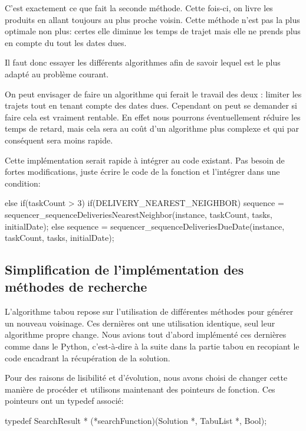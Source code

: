 \documentclass[hideweeklyreports]{polytech/polytech}
\begin{document}
				C'est exactement ce que fait la seconde méthode. Cette fois-ci, on livre les produits en allant toujours au plus proche voisin. Cette méthode n'est pas la plus optimale non plus: certes elle diminue les temps de trajet mais elle ne prends plus en compte du tout les dates dues.
				
				Il faut donc essayer les différents algorithmes afin de savoir lequel est le plus adapté au problème courant.
				
				On peut envisager de faire un algorithme qui ferait le travail des deux : limiter les trajets tout en tenant compte des dates dues. Cependant on peut se demander si faire cela est vraiment rentable. En effet nous pourrons éventuellement réduire les temps de retard, mais cela sera au coût d'un algorithme plus complexe et qui par conséquent sera moins rapide.
				
				Cette implémentation serait rapide à intégrer au code existant. Pas besoin de fortes modifications, juste écrire le code de la fonction et l'intégrer dans une condition:
				\begin{csource}
else if(taskCount > 3)
{
	if(DELIVERY_NEAREST_NEIGHBOR)
		sequence = sequencer_sequenceDeliveriesNearestNeighbor(instance, taskCount, tasks, initialDate);
	else
		sequence = sequencer_sequenceDeliveriesDueDate(instance, taskCount, tasks, initialDate);
}
				\end{csource}
				
				\subsection{\label{searchfunc}Simplification de l'implémentation des méthodes de recherche}
				L'algorithme tabou repose sur l'utilisation de différentes méthodes pour générer un nouveau voisinage. Ces dernières ont une utilisation identique, seul leur algorithme propre change. Nous avions tout d'abord implémenté ces dernières comme dans le Python, c'est-à-dire à la suite dans la partie tabou en recopiant le code encadrant la récupération de la solution.
				
				Pour des raisons de lisibilité et d'évolution, nous avons choisi de changer cette manière de procéder et utilisons maintenant des pointeurs de fonction. Ces pointeurs ont un typedef associé:
				\begin{csource}
typedef SearchResult * (*searchFunction)(Solution *, TabuList *, Bool);
				\end{csource}
				
\end{document}
